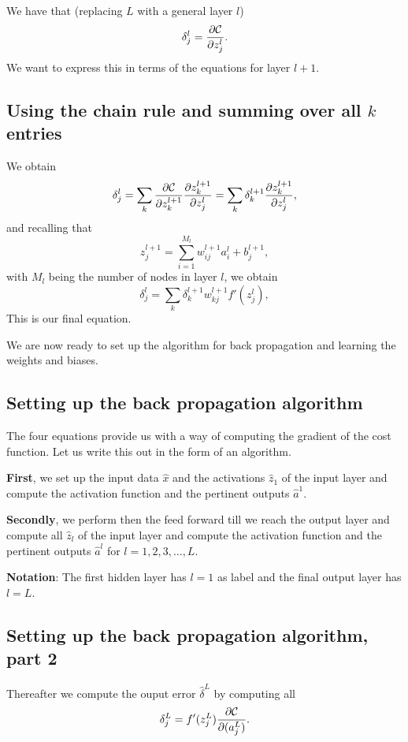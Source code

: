 \documentclass[%
oneside,                 %
final,                   %
10pt]{article}
\begin{document}
We have that (replacing $L$ with a general layer $l$)
\[
\delta_j^l =\frac{\partial {\cal C}}{\partial z_j^l}.
\]
We want to express this in terms of the equations for layer $l+1$.

\subsection{Using the chain rule and summing over all $k$ entries}

We obtain
\[
\delta_j^l =\sum_k \frac{\partial {\cal C}}{\partial z_k^{l+1}}\frac{\partial z_k^{l+1}}{\partial z_j^{l}}=\sum_k \delta_k^{l+1}\frac{\partial z_k^{l+1}}{\partial z_j^{l}},
\]
and recalling that
\[
z_j^{l+1} = \sum_{i=1}^{M_{l}}w_{ij}^{l+1}a_i^{l}+b_j^{l+1},
\]
with $M_l$ being the number of nodes in layer $l$, we obtain
\[
\delta_j^l =\sum_k \delta_k^{l+1}w_{kj}^{l+1}f'(z_j^l),
\]
This is our final equation.

We are now ready to set up the algorithm for back propagation and learning the weights and biases.

\subsection{Setting up the back propagation algorithm}

The four equations  provide us with a way of computing the gradient of the cost function. Let us write this out in the form of an algorithm.

\textbf{First}, we set up the input data $\hat{x}$ and the activations
$\hat{z}_1$ of the input layer and compute the activation function and
the pertinent outputs $\hat{a}^1$.

\textbf{Secondly}, we perform then the feed forward till we reach the output
layer and compute all $\hat{z}_l$ of the input layer and compute the
activation function and the pertinent outputs $\hat{a}^l$ for
$l=1,2,3,\dots,L$.

\textbf{Notation}: The first hidden layer has $l=1$ as label and the final output layer has $l=L$.

\subsection{Setting up the back propagation algorithm, part 2}

Thereafter we compute the ouput error $\hat{\delta}^L$ by computing all
\[
\delta_j^L = f'(z_j^L)\frac{\partial {\cal C}}{\partial (a_j^L)}.
\]
\end{document}
